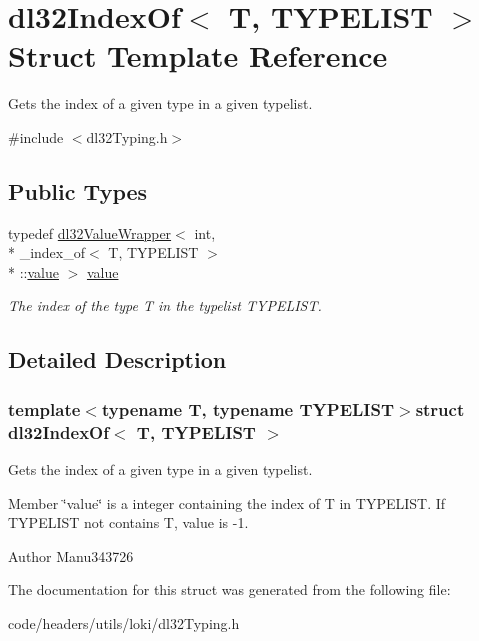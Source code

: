 \hypertarget{structdl32_index_of}{\section{dl32\-Index\-Of$<$ T, T\-Y\-P\-E\-L\-I\-S\-T $>$ Struct Template Reference}
\label{structdl32_index_of}
}


Gets the index of a given type in a given typelist.  




{\ttfamily \#include $<$dl32\-Typing.\-h$>$}

\subsection*{Public Types}
\begin{DoxyCompactItemize}
\item 
\hypertarget{structdl32_index_of_a324d144d706c5dbfc95acc788549a191}{typedef \hyperlink{structdl32_value_wrapper}{dl32\-Value\-Wrapper}$<$ int, \\*
\-\_\-index\-\_\-of$<$ T, T\-Y\-P\-E\-L\-I\-S\-T $>$\\*
\-::\hyperlink{structdl32_index_of_a324d144d706c5dbfc95acc788549a191}{value} $>$ \hyperlink{structdl32_index_of_a324d144d706c5dbfc95acc788549a191}{value}}\label{structdl32_index_of_a324d144d706c5dbfc95acc788549a191}

\begin{DoxyCompactList}\small\item\em The index of the type T in the typelist T\-Y\-P\-E\-L\-I\-S\-T. \end{DoxyCompactList}\end{DoxyCompactItemize}


\subsection{Detailed Description}
\subsubsection*{template$<$typename T, typename T\-Y\-P\-E\-L\-I\-S\-T$>$struct dl32\-Index\-Of$<$ T, T\-Y\-P\-E\-L\-I\-S\-T $>$}

Gets the index of a given type in a given typelist. 

Member \char`\"{}value\char`\"{} is a integer containing the index of T in T\-Y\-P\-E\-L\-I\-S\-T. If T\-Y\-P\-E\-L\-I\-S\-T not contains T, value is -\/1.

\begin{DoxyAuthor}{Author}
Manu343726 
\end{DoxyAuthor}


The documentation for this struct was generated from the following file\-:\begin{DoxyCompactItemize}
\item 
code/headers/utils/loki/dl32\-Typing.\-h\end{DoxyCompactItemize}
